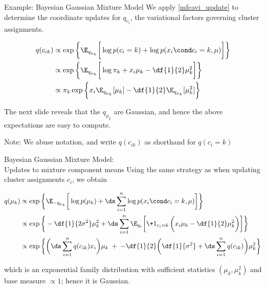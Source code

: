 \documentclass[10pt]{beamer}
\begin{document}
\begin{frame}{Example: Bayesian Gaussian Mixture Model}
We apply \eqref{mfcavi_update} to determine the coordinate updates for $q_{c_i}$, the variational factors governing cluster assignments.   %

\begin{align*}
q(c_{ik}) & \propto \exp \bigg\{ \E_{q_{\mu_k}} \bigg[  \log p(c_i =k) + \log p(x_i \cond c_i=k, \mu) \bigg] \bigg\} \\
& \propto \exp \bigg\{ \E_{q_{\mu_k}} \bigg[ \log \pi_k + x_i \mu_k - \df{1}{2} \mu_k^2 \bigg] \bigg\} \\
& \propto \pi_k \exp \bigg\{ x_i \E_{q_{\mu_k}} [\mu_k] - \df{1}{2}  \E_{q_{\mu_k}} [ \mu_k^2] \bigg\} \\
\end{align*}

The next slide reveals that the $q_{\mu_k}$ are Gaussian, and hence the above expectations are easy to compute. 

\vfill
\tiny
\alert{Note:} We abuse notation, and write $q(c_{ik})$ as shorthand for $q(c_i =k)$
\end{frame}

\begin{frame}{Bayesian Gaussian Mixture Model: \\ Updates to mixture component means}
Using the same strategy as when updating cluster assignments $c_i$, we obtain

\begin{align*}
q(\mu_k) & \propto \exp \bigg\{ \E_{-q_{\mu_k}} \bigg[  \log p(\mu_k) + \ds\sum_{i=1}^n \log p(x_i \cond c_i=k, \mu) \bigg] \bigg\} \\
& \propto \exp \bigg\{ -\df{1}{2  \sigma^2} \mu_k^2 +  \ds\sum_{i=1}^{n} \E_{q_c} \bigg[ \+1_{c_i=k}\, \bigg(x_i \mu_k - \df{1}{2} \mu_k^2\bigg) \bigg] \bigg\} \\
& \propto \exp \bigg\{  \bigg( \ds\sum_{i=1}^n q(c_{ik})x_i  \bigg) \mu_k   \; +  \; -\df{1}{2} \bigg(\df{1}{ \sigma^2} + \ds\sum_{i=1}^n q(c_{ik}) \bigg) \mu_k^2 \bigg\} \\
\end{align*}


 
which is an exponential family distribution with sufficient statistics $(\mu_k, \mu_k^2)$  and base measure $\propto 1$; hence it is Gaussian. 

\end{frame}
\end{document}
